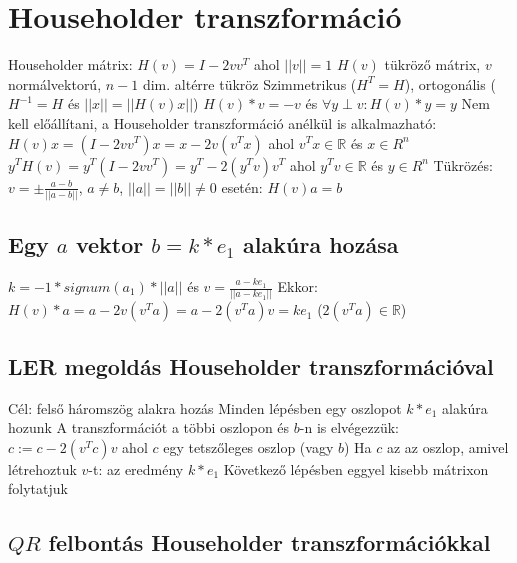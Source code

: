 \documentclass[12pt,a4paper]{article}
\begin{document}
\pagebreak

\section{Householder transzformáció}

\begin{outline}
	\1 Householder mátrix: $H(v) = I - 2vv^T$ ahol $||v||=1$
		\2 $H(v)$ tükröző mátrix, $v$ normálvektorú, $n-1$ dim. altérre tükröz
		\2 Szimmetrikus ($H^T=H$), ortogonális ($H^{-1} = H$ és $||x||=||H(v)x||$)
		\2 $H(v) * v = -v$ és $\forall y \perp v: H(v) * y = y$
		\2 Nem kell előállítani, a Householder transzformáció anélkül is alkalmazható:\\
		$H(v)x = (I - 2vv^T)x = x - 2v(v^Tx)$ ahol $v^Tx \in \mathbb{R}$ és $x \in R^n$\\
		$y^TH(v) = y^T(I - 2vv^T) = y^T - 2(y^Tv)v^T$ ahol $y^Tv \in \mathbb{R}$ és $y \in R^n$
	\1 Tükrözés: $v = \pm \frac{a-b}{||a-b||}$, $a \ne b$, $||a||=||b|| \ne 0$ esetén: $H(v)a=b$
\end{outline}

\subsection{Egy $a$ vektor $b = k * e_1$ alakúra hozása}

\begin{outline}
	\1 $k = -1 * signum(a_1) * ||a||$ \;\; és \;\;
	$v = \frac{a - k e_1}{||a - k e_1||}$
	\1 Ekkor: $H(v) * a = a - 2v(v^Ta) = a - 2(v^Ta)v = k e_1$ \;\; ($2(v^Ta) \in \mathbb{R}$)
\end{outline}

\subsection{LER megoldás Householder transzformációval}

\begin{outline}
	\1 Cél: felső háromszög alakra hozás
	\1 Minden lépésben egy oszlopot $k*e_1$ alakúra hozunk
	\1 A transzformációt a többi oszlopon és $b$-n is elvégezzük:\\
	$c := c - 2(v^Tc)v$ ahol $c$ egy tetszőleges oszlop (vagy $b$)
		\2 Ha $c$ az az oszlop, amivel létrehoztuk $v$-t: az eredmény $k*e_1$
	\1 Következő lépésben eggyel kisebb mátrixon folytatjuk
\end{outline}

\subsection{$QR$ felbontás Householder transzformációkkal}
\end{document}
